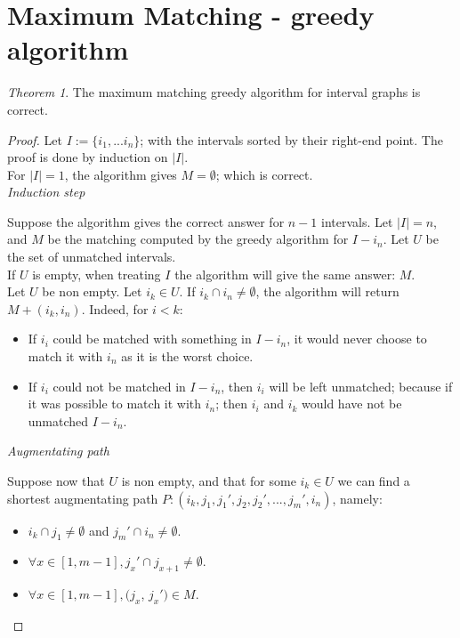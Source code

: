 \documentclass[12pt]{article}
\begin{document}
\theoremstyle{definition}
\newtheorem{definition}{Definition}[section]

\theoremstyle{remark}
\newtheorem*{remark}{Remark}
\newtheorem{theorem}{Theorem}[section]
\newtheorem{lemma}[theorem]{Lemma}

\section{Maximum Matching - greedy algorithm}

\begin{theorem}
    The maximum matching greedy algorithm for interval graphs is correct.
\end{theorem}

\begin{proof}
    Let $I:= \{i_1, ... i_n\}$; with the intervals sorted by their right-end point.
    The proof is done by induction on $|I|$.\\
    For $|I|=1$, the algorithm gives $M=\emptyset$; which is correct. \\

    \textit{Induction step}
    \vspace{\baselineskip}

    Suppose the algorithm gives the correct answer for $n-1$ intervals. Let $|I| = n$, and $M$ be the matching computed by the greedy algorithm for $I-i_n$. Let $U$ be the set of unmatched intervals. \\
    If $U$ is empty, when treating $I$ the algorithm will give the same answer: $M$.\\
    Let $U$ be non empty. Let $i_k \in U$. If $i_k \cap i_n \ne \emptyset$, the algorithm will return $M+(i_k, i_n)$. 
    Indeed, for $i<k$:
    \begin{itemize}
        \item If $i_i$ could be matched with something in $I-i_n$, it would never choose to match it with $i_n$ as it is the worst choice. 
        \item If $i_i$ could not be matched in $I-i_n$, then $i_i$ will be left unmatched; because if it was possible to match it with $i_n$; then $i_i$ and $i_k$ would have not be unmatched $I-i_n$. 
    \end{itemize} 

    \textit{Augmentating path}
    \vspace{\baselineskip}

    Suppose now that $U$ is non empty, and that for some $i_k \in U$ we can find a shortest augmentating path $P: (i_k, j_1, j_1', j_2, j_2', ... , j_m', i_n)$, namely:
    \begin{itemize}
        \item $i_k \cap j_1 \ne \emptyset$ and $j_m'\cap i_n \ne \emptyset$.
        \item $\forall x \in [1, m-1], j_x' \cap j_{x+1} \ne \emptyset$.
        \item $\forall x \in [1, m-1], (j_x$, $j_x') \in M$.
        

\end{itemize}
\end{proof}
\end{document}
